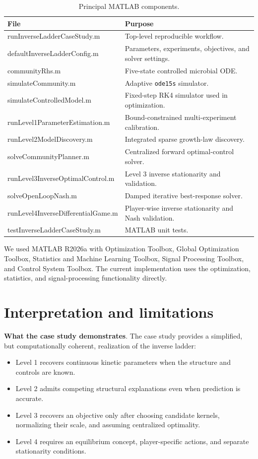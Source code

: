 \documentclass[11pt,a4paper]{article}
\begin{document}
\begin{table}[H]
\centering
\caption{Principal MATLAB components.}
\label{tab:software}
\begin{tabularx}{\textwidth}{>{\ttfamily}l X}
\toprule
\normalfont File & Purpose\\
\midrule
runInverseLadderCaseStudy.m & Top-level reproducible workflow.\\
defaultInverseLadderConfig.m & Parameters, experiments, objectives, and solver settings.\\
communityRhs.m & Five-state controlled microbial ODE.\\
simulateCommunity.m & Adaptive \texttt{ode15s} simulator.\\
simulateControlledModel.m & Fixed-step RK4 simulator used in optimization.\\
runLevel1ParameterEstimation.m & Bound-constrained multi-experiment calibration.\\
runLevel2ModelDiscovery.m & Integrated sparse growth-law discovery.\\
solveCommunityPlanner.m & Centralized forward optimal-control solver.\\
runLevel3InverseOptimalControl.m & Level 3 inverse stationarity and validation.\\
solveOpenLoopNash.m & Damped iterative best-response solver.\\
runLevel4InverseDifferentialGame.m & Player-wise inverse stationarity and Nash validation.\\
testInverseLadderCaseStudy.m & MATLAB unit tests.\\
\bottomrule
\end{tabularx}
\end{table}

We used MATLAB R2026a with
Optimization Toolbox, Global Optimization Toolbox, Statistics and Machine
Learning Toolbox, Signal Processing Toolbox, and Control System Toolbox. The current implementation uses
the optimization, statistics, and signal-processing functionality directly.

\section[Interpretation and limitations]{\hspace{0.5em}Interpretation and limitations}

\textbf{What the case study demonstrates}. The case study provides a simplified, but computationally coherent, realization of the inverse
ladder:
\begin{itemize}
  \item Level 1 recovers continuous kinetic parameters when the structure and
        controls are known.
  \item Level 2 admits competing structural explanations even when prediction
        is accurate.
  \item Level 3 recovers an objective only after choosing candidate kernels,
        normalizing their scale, and assuming centralized optimality.
  \item Level 4 requires an equilibrium concept, player-specific actions, and
        separate stationarity conditions.
\end{itemize}
\end{document}
